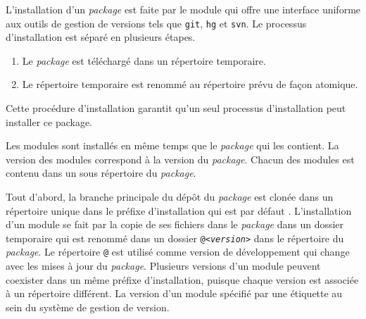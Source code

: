 L'installation d'un \textit{package} est faite par le module  qui
offre une interface uniforme aux outils de gestion de versions tels que
\texttt{git}, \texttt{hg} et \texttt{svn}.  Le processus d'installation est
séparé en plusieurs étapes.
\begin{enumerate}
  \item Le \textit{package} est téléchargé dans un répertoire temporaire.
  \item Le répertoire temporaire est renommé au répertoire prévu de façon atomique.
\end{enumerate}
Cette procédure d'installation garantit qu'un seul processus d'installation peut
installer ce package.

Les modules sont installés en même temps que le \textit{package} qui les
contient. La version des modules correspond à la version du \textit{package}.
Chacun des modules est contenu dans un sous répertoire du \textit{package}.

Tout d'abord, la branche principale du dépôt du \textit{package} est clonée
dans un répertoire unique dans le préfixe d'installation qui est par défaut
. L'installation d'un module se fait par la copie de ses
fichiers dans le \textit{package} dans un dossier temporaire qui est renommé
dans un dossier \texttt{@\textit{<version>}} dans le répertoire du
\textit{package}. Le répertoire {\tt @} est utilisé comme version de
développement qui change avec les mises à jour du \textit{package}.  Plusieurs
versions d'un module peuvent coexister dans un même préfixe d'installation,
puisque chaque version est associée à un répertoire différent.  La version d'un
module spécifié par une étiquette au sein du système de gestion de version.



